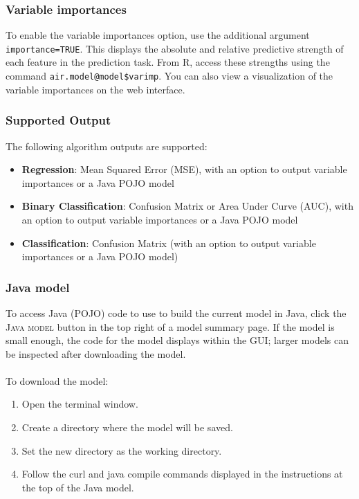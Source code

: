 \documentclass{article}[11pt]
\begin{document}
{\subsubsection{Variable importances} 

To enable the variable importances option, use the additional argument \texttt{importance=TRUE}. This displays the absolute and relative predictive strength of each feature in the prediction task. From R, access these strengths using the command \texttt{air.model@model\$varimp}. You can also view a visualization of the variable
importances on the web interface.

\subsubsection{Supported Output}

The following algorithm outputs are supported: 
\begin{itemize}
\item {\bf{Regression}}: Mean Squared Error (MSE), with an option to output variable importances or a Java POJO model
\item {\bf{Binary Classification}}: Confusion Matrix or Area Under Curve (AUC), with an option to output variable importances or a Java POJO model
\item {\bf{Classification}}: Confusion Matrix (with an option to output variable importances or a Java POJO model)
\end{itemize}

\subsubsection{Java model}  

To access Java (POJO) code to use to build the current model in Java, click the \textsc{Java model} button in the top right of a model summary page. If the model is small enough, the code for the model displays within the GUI; larger models can be inspected after downloading the model.
\\
\\
To download the model: 
\begin{enumerate}
\item Open the terminal window.
\item Create a directory where the model will be saved.
\item Set the new directory as the working directory.
\item Follow the curl and java compile commands displayed in the instructions at the top of the Java model.
\end{enumerate}

}
\end{document}
